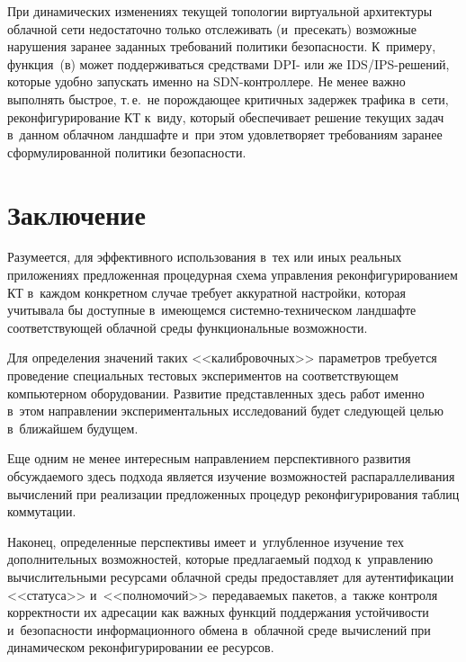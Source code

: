 \begin{multicols}{2}
  При динамических изменениях текущей топологии виртуальной архитектуры 
облачной сети недостаточно только отслеживать (и~пресекать) возможные 
нарушения заранее заданных требо\-ваний политики безопасности. К~примеру, 
функция~(в) может поддерживаться средствами DPI- или же  
IDS/IPS-ре\-ше\-ний, которые удобно запускать именно на SDN-конт\-рол\-ле\-ре. Не 
менее важно выполнять быстрое, т.\,е.\ не порождающее критичных задержек 
трафика в~сети, реконфигурирование КТ к~виду, который обеспечивает решение 
текущих задач в~данном облачном ландшафте и~при этом удовлетворяет 
требованиям заранее сформулированной политики безопасности.

\vspace*{-6pt}
  
\section{Заключение}

\vspace*{-2pt}
  
  Разумеется, для эффективного использования в~тех или иных реальных 
приложениях предложенная процедурная схема управления 
реконфигурированием КТ в~каждом конкретном случае требует аккуратной 
настройки, которая учитывала бы доступные в~имеющемся  
сис\-тем\-но-тех\-ни\-че\-ском ландшафте соответствующей облачной среды 
функциональные возможности. 
  
  Для определения значений таких <<калибровочных>> параметров требуется 
проведение специальных тестовых экспериментов на соответствующем 
компьютерном оборудовании. Развитие пред\-став\-лен\-ных здесь работ именно 
в~этом направлении экспериментальных исследований будет сле\-ду\-ющей целью 
в~ближайшем будущем.
  
  Еще одним не менее интересным направлением перспективного развития 
обсуждаемого здесь подхода является изучение возможностей 
распараллеливания вычислений при реализации предложенных процедур 
реконфигурирования таблиц коммутации.
  
  Наконец, определенные перспективы имеет и~углубленное изучение тех 
дополнительных возможностей, которые предлагаемый подход к~управ\-ле\-нию 
вычислительными ресурсами облачной среды предоставляет для 
аутентификации <<статуса>> и~<<полномочий>> передаваемых пакетов, 
а~также контроля корректности их адресации как важных функций 
поддержания устойчивости и~без\-опас\-ности информационного обмена 
в~облачной среде вычислений при динамическом реконфигурировании ее 
ресурсов.


\end{multicols}
